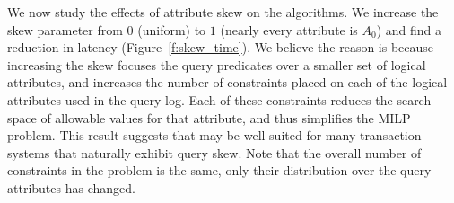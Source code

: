  We now study the effects of attribute skew on the algorithms.
We increase the skew parameter from $0$ (uniform) to $1$ (nearly every attribute is $A_0$) 
and find a reduction in latency (Figure~\ref{f:skew_time}).
We believe the reason is because increasing the skew focuses the query predicates over a smaller set of logical attributes, 
and increases the number of constraints placed on each of the logical attributes used in the query log.  
Each of these constraints reduces the search space of allowable values for that attribute, and thus simplifies the MILP problem.
This result suggests that \sys may be well suited for many transaction systems that naturally exhibit query skew.
Note that the overall number of constraints in the problem is the same, only their distribution over the query attributes has changed.



% 
% 
% 



